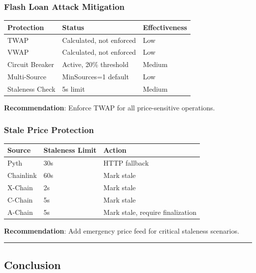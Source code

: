 \documentclass[
]{article}
\newcounter{none} %
\begin{document}
\subsubsection{Flash Loan Attack
Mitigation}\label{flash-loan-attack-mitigation}

{\def\LTcaptype{none} %
\begin{longtable}[]{@{}lll@{}}
\toprule\noalign{}
Protection & Status & Effectiveness \\
\midrule\noalign{}
\endhead
\bottomrule\noalign{}
\endlastfoot
TWAP & Calculated, not enforced & Low \\
VWAP & Calculated, not enforced & Low \\
Circuit Breaker & Active, 20\% threshold & Medium \\
Multi-Source & MinSources=1 default & Low \\
Staleness Check & 5s limit & Medium \\
\end{longtable}
}

\textbf{Recommendation}: Enforce TWAP for all price-sensitive
operations.

\subsubsection{Stale Price Protection}\label{stale-price-protection}

{\def\LTcaptype{none} %
\begin{longtable}[]{@{}lll@{}}
\toprule\noalign{}
Source & Staleness Limit & Action \\
\midrule\noalign{}
\endhead
\bottomrule\noalign{}
\endlastfoot
Pyth & 30s & HTTP fallback \\
Chainlink & 60s & Mark stale \\
X-Chain & 2s & Mark stale \\
C-Chain & 5s & Mark stale \\
A-Chain & 5s & Mark stale, require finalization \\
\end{longtable}
}

\textbf{Recommendation}: Add emergency price feed for critical staleness
scenarios.

\begin{center}\rule{0.5\linewidth}{0.5pt}\end{center}

\subsection{Conclusion}\label{conclusion}
\end{document}
